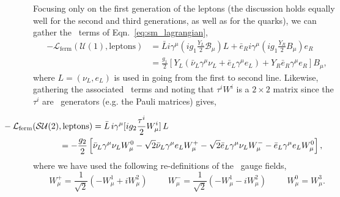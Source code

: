 Focusing only on the first generation of the leptons (the discussion holds equally well
for the second and third generations, as well as for the quarks), we can gather the
\Uone~terms of Eqn.~\ref{eq:sm_lagrangian},
\begin{align}
    -\mathcal{L}_{\text{ferm}}(\mathcal{U}(1), \text{leptons}) &= \bar{L} i \gamma^{\mu} (i g_1 \frac{Y_L}{2} \mathcal{B}_{\mu})L + \bar{e}_R i \gamma^{\mu} (i g_1 \frac{Y_R}{2} B_{\mu}) e_R \nonumber \\
    &= \frac{g_1}{2} [ Y_L ( \bar{\nu}_L \gamma^{\mu} \nu_L + \bar{e}_L \gamma^{\mu} e_L) + Y_R \bar{e}_R \gamma^{\mu} e_R ] B_{\mu},
    \label{eq:ferm_L_u1}
\end{align}
where $L = (\nu_L, e_L)$ is used in going from the first to second line. 
Likewise, gathering the associated \SUtwo~terms and noting that $\tau^i W^i$ is a
$2\times2$ matrix since the $\tau^i$ are \SUtwo~generators (e.g. the Pauli matrices) gives,

\begin{equation}
	\begin{multlined}
		\hspace{-2cm}-\mathcal{L}_{\text{ferm}}(\mathcal{SU}(2), \text{leptons}) =  \bar{L}\, i \gamma^{\mu} [i g_2 \frac{\tau^i}{2} W_{\mu}^i ] \,L \\
		= -\frac{g_2}{2} \left[ \bar{\nu}_L \gamma^{\mu} \nu_L W_{\mu}^0 - \sqrt{2}  \bar{\nu}_L \gamma^{\mu} e_L W_{\mu}^+ - \sqrt{2} \bar{e}_L \gamma^{\mu} \nu_L W_{\mu}^- - \bar{e}_L \gamma^{\mu} e_L W_{\mu}^0 \right],
	\end{multlined}
	\label{eq:ferm_L_su2}
\end{equation}
where we have used the following re-definitions of the \SUtwo~gauge fields,
\begin{equation}
	W_{\mu}^+ = \frac{1}{\sqrt{2}} \left( -W_{\mu}^1 + i W_{\mu}^2 \right) \hspace{1cm} W_{\mu}^- = \frac{1}{\sqrt{2}} \left( -W_{\mu}^1 - i W_{\mu}^2 \right) \hspace{1cm} W_{\mu}^0 = W_{\mu}^3.
\end{equation}

